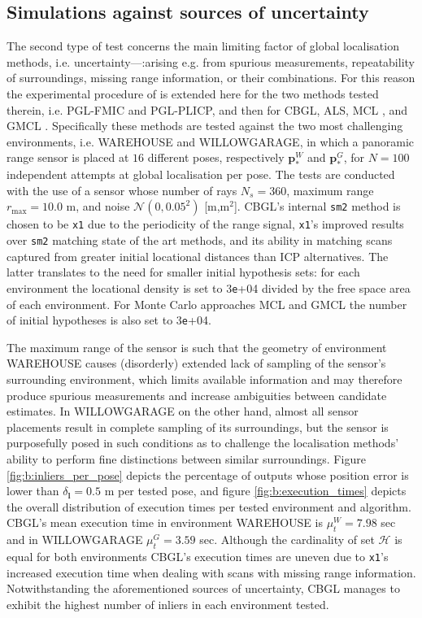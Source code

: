 \subsection{Simulations against sources of uncertainty}
\label{subsec:exp_b}

The second type of test concerns the main limiting factor of global
localisation methods, i.e. uncertainty---:arising e.g. from spurious
measurements, repeatability of surroundings, missing range information, or
their combinations. For this reason the experimental procedure of
\cite{Filotheou2022g} is extended here for the two methods tested therein, i.e.
PGL-FMIC and PGL-PLICP, and then for CBGL, ALS, MCL \cite{mcl}, and GMCL
\cite{gmcl}.  Specifically these methods are tested against the two most
challenging environments, i.e. WAREHOUSE and WILLOWGARAGE, in which a panoramic
range sensor is placed at $16$ different poses, respectively
$\bm{p}_{\ast}^{W}$ and $\bm{p}_{\ast}^{G}$, for $N = 100$ independent attempts
at global localisation per pose. The tests are conducted with the use
of a sensor whose number of rays $N_s = 360$, maximum range $r_{\max} = 10.0$
m, and noise $\mathcal{N}(0, 0.05^2)$ [m,m$^2$]. CBGL's internal \texttt{sm2}
method is chosen to be \texttt{x1} \cite{Filotheou2023a} due to the periodicity
of the range signal, \texttt{x1}'s improved results over \texttt{sm2} matching
state of the art methods, and its ability in matching scans captured from
greater initial locational distances than ICP alternatives. The latter
translates to the need for smaller initial hypothesis sets: for each
environment the locational density is set to $3$\texttt{e}+04 divided by the
free space area of each environment. For Monte Carlo approaches MCL and GMCL
the number of initial hypotheses is also set to $3$\texttt{e}+04.

The maximum range of the sensor is such that the geometry of environment
WAREHOUSE causes (disorderly) extended lack of sampling of the sensor's
surrounding environment, which limits available information and may therefore
produce spurious measurements and increase ambiguities between candidate
estimates. In WILLOWGARAGE on the other hand, almost all sensor placements
result in complete sampling of its surroundings, but the sensor is purposefully
posed in such conditions as to challenge the localisation methods' ability to
perform fine distinctions between similar surroundings. Figure
\ref{fig:b:inliers_per_pose} depicts the percentage of outputs whose position
error is lower than $\delta_{\bm{l}} = 0.5$ m per tested pose, and figure
\ref{fig:b:execution_times} depicts the overall distribution of execution times
per tested environment and algorithm. CBGL's mean execution time in environment
WAREHOUSE is $\mu_t^W = 7.98$ sec and in WILLOWGARAGE $\mu_t^{G} = 3.59$ sec.
Although the cardinality of set $\mathcal{H}$ is equal for both environments
CBGL's execution times are uneven due to \texttt{x1}'s increased execution
time when dealing with scans with missing range information. Notwithstanding
the aforementioned sources of uncertainty, CBGL manages to exhibit the highest
number of inliers in each environment tested.


